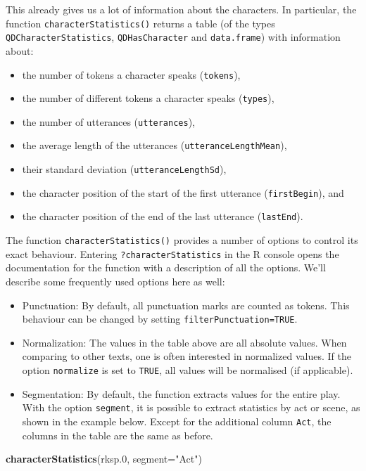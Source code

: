 \documentclass[]{book}
\newenvironment{Shaded}{\begin{snugshade}}{\end{snugshade}}
\newcommand{\DataTypeTok}[1]{\textcolor[rgb]{0.13,0.29,0.53}{#1}}
\newcommand{\FloatTok}[1]{\textcolor[rgb]{0.00,0.00,0.81}{#1}}
\newcommand{\KeywordTok}[1]{\textcolor[rgb]{0.13,0.29,0.53}{\textbf{#1}}}
\newcommand{\NormalTok}[1]{#1}
\newcommand{\StringTok}[1]{\textcolor[rgb]{0.31,0.60,0.02}{#1}}
\providecommand{\tightlist}{%
  \setlength{\itemsep}{0pt}\setlength{\parskip}{0pt}}
\begin{document}
This already gives us a lot of information about the characters. In particular, the function \texttt{characterStatistics()} returns a table (of the types \texttt{QDCharacterStatistics}, \texttt{QDHasCharacter} and \texttt{data.frame}) with information about:

\begin{itemize}
\tightlist
\item
  the number of tokens a character speaks (\texttt{tokens}),
\item
  the number of different tokens a character speaks (\texttt{types}),
\item
  the number of utterances (\texttt{utterances}),
\item
  the average length of the utterances (\texttt{utteranceLengthMean}),
\item
  their standard deviation (\texttt{utteranceLengthSd}),
\item
  the character position of the start of the first utterance (\texttt{firstBegin}), and
\item
  the character position of the end of the last utterance (\texttt{lastEnd}).
\end{itemize}

The function \texttt{characterStatistics()} provides a number of options to control its exact behaviour. Entering \texttt{?characterStatistics} in the R console opens the documentation for the function with a description of all the options. We'll describe some frequently used options here as well:

\begin{itemize}
\item
  Punctuation: By default, all punctuation marks are counted as tokens. This behaviour can be changed by setting \texttt{filterPunctuation=TRUE}.
\item
  Normalization: The values in the table above are all absolute values. When comparing to other texts, one is often interested in normalized values. If the option \texttt{normalize} is set to \texttt{TRUE}, all values will be normalised (if applicable).
\item
  Segmentation: By default, the function extracts values for the entire play. With the option \texttt{segment}, it is possible to extract statistics by act or scene, as shown in the example below. Except for the additional column \texttt{Act}, the columns in the table are the same as before.
\end{itemize}

\begin{Shaded}
\begin{Highlighting}[]
\KeywordTok{characterStatistics}\NormalTok{(rksp}\FloatTok{.0}\NormalTok{, }
                    \DataTypeTok{segment=}\StringTok{"Act"}\NormalTok{)}
\end{Highlighting}
\end{Shaded}
\end{document}

